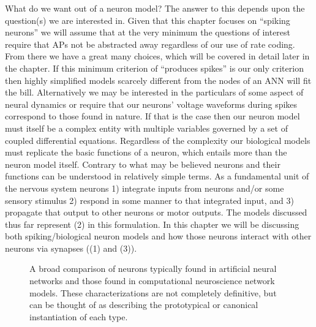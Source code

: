What do we want out of a neuron model? The answer to this depends upon the question(s) we are interested in. Given that this chapter focuses on ``spiking neurons'' we will assume that at the very minimum the questions of interest require that APs not be abstracted away regardless of our use of rate coding. From there we have a great many choices, which will be covered in detail later in the chapter. If this minimum criterion of ``produces spikes'' is our only criterion then highly simplified models scarcely different from the nodes of an ANN will fit the bill. Alternatively we may be interested in the particulars of some aspect of neural dynamics or require that our neurons' voltage waveforms during spikes correspond to those found in nature. If that is the case then our neuron model must itself be a complex entity with multiple variables governed by a set of coupled differential equations. Regardless of the complexity our biological models must replicate the basic functions of a neuron, which entails more than the neuron model itself. Contrary to what may be believed neurons and their functions can be understood in relatively simple terms. As a fundamental unit of the nervous system neurons 1) integrate inputs from neurons and/or some sensory stimulus 2) respond in some manner to that integrated input, and 3) propagate that output to other neurons or motor outputs. The models discussed thus far represent (2) in this formulation. In this chapter we will be discussing both spiking/biological neuron models and how those neurons interact with other neurons via synapses ((1) and (3)).

\begin{figure}[h]
\centering
{}
\caption[Simbrain Screenshot by Zo\"e Tosi ]{A broad comparison of neurons typically found in artificial neural networks and those found in computational neuroscience network models. These characterizations are not completely definitive, but can be thought of as describing the prototypical or canonical instantiation of each type.}
\label{NeuComp}
\end{figure}

